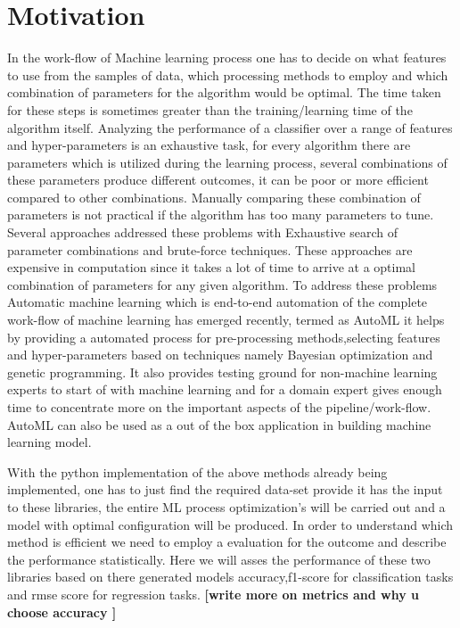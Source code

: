 \section{Motivation}
In the work-flow of Machine learning process one has to decide on what features to use from the samples of data, which processing methods to employ and which combination of parameters for the algorithm would be optimal. The time taken for these steps is sometimes greater than the training/learning time of the algorithm itself. 
Analyzing the performance of a classifier over a range of features and hyper-parameters is an exhaustive task, for every algorithm there are parameters  which is utilized during the learning process, several combinations of these parameters produce different outcomes, it can be poor or more efficient compared to other combinations. Manually comparing these combination of parameters is not practical if the algorithm has too many parameters to tune. Several approaches addressed these problems with Exhaustive search of parameter combinations and brute-force techniques. These approaches are expensive in computation since it takes a lot of time to arrive at a optimal combination of parameters for any given algorithm. To address these problems Automatic machine learning which is end-to-end automation of the complete work-flow of machine learning has emerged recently, termed as AutoML\cite{autoML} it helps by providing a automated process for pre-processing methods,selecting features and hyper-parameters based on techniques namely Bayesian optimization and genetic programming. It also provides testing ground for non-machine learning experts to start of with machine learning and for a domain expert gives enough time to concentrate more on the important aspects of the pipeline/work-flow. AutoML can also be used as a out of the box application in building machine learning model.

With the python implementation of the above methods already being implemented, one has to just find the required data-set provide it has the input to these libraries, the entire ML process optimization's will be carried out and a model with optimal configuration will be produced.
In order to understand which method is efficient we need to employ a evaluation for the outcome and describe the performance statistically. Here we will asses the performance of these two libraries based on there generated models accuracy,f1-score for classification tasks and rmse score for regression tasks. \textbf{[write more on metrics and why u choose accuracy ]}

